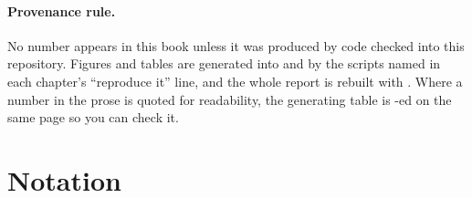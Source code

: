 \paragraph{Provenance rule.} No number appears in this book unless it was produced by
code checked into this repository. Figures and tables are generated into
 and  by the scripts named in each chapter's
``reproduce it'' line, and the whole report is rebuilt with
. Where a number in the prose is quoted for
readability, the generating table is -ed on the same page so
you can check it.

\vspace{1em}

\section*{Notation}
\label{sec:notation}


